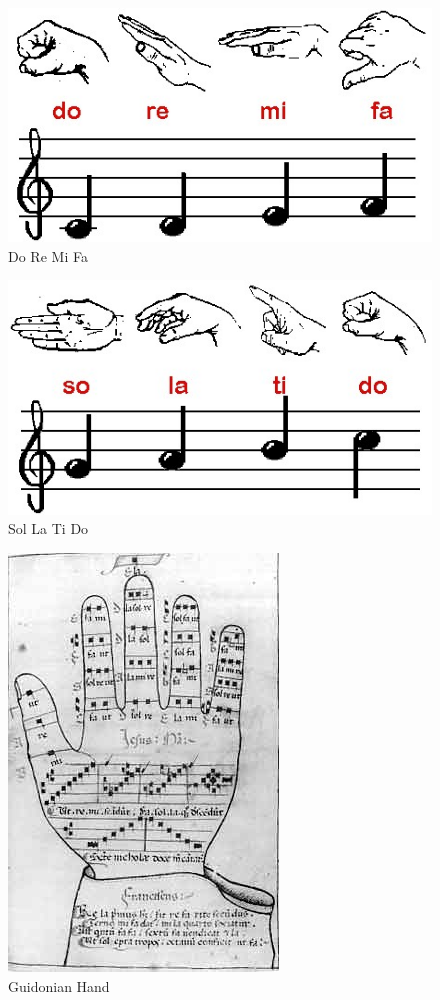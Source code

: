\begin{figure}[h]
	\center{}
	\label{fig:doremifa}
	\includegraphics[width=0.3\linewidth]{figures/doremifa.jpg}
	\caption{Do Re Mi Fa}
\end{figure}

\begin{figure}[h]
	\center{}
	\label{fig:curwen}
	\includegraphics[width=0.3\linewidth]{figures/solatido.jpg}
	\caption{Sol La Ti Do}
\end{figure}

\begin{figure}[h]
	\center{}
	\label{fig:curwen}
	\includegraphics[width=0.3\linewidth]{figures/guidonian_hand.jpg}
	\caption{Guidonian Hand}
\end{figure}




